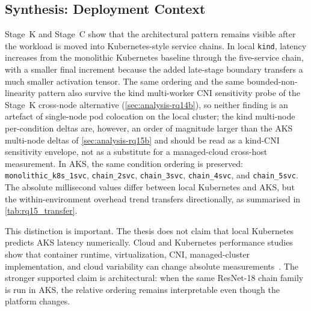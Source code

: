 \subsection{Synthesis: Deployment Context}
\label{sec:analysis-deployment-synthesis}

Stage~K and Stage~C show that the architectural pattern remains visible after the
workload is moved into Kubernetes-style service chains. In local
\texttt{kind}, latency increases from the monolithic Kubernetes baseline
through the five-service chain, with a smaller final increment because
the added late-stage boundary transfers a much smaller
activation tensor. The same ordering and the same bounded-non-linearity
pattern also survive the kind multi-worker CNI sensitivity probe of
the Stage~K cross-node alternative (\cref{sec:analysis-rq14b}), so neither finding is an artefact
of single-node pod colocation on the local cluster; the kind multi-node
per-condition deltas are, however, an order of magnitude larger than the
AKS multi-node deltas of \cref{sec:analysis-rq15b} and should be read as
a kind-CNI sensitivity envelope, not as a substitute for a managed-cloud
cross-host measurement. In AKS, the same condition ordering is preserved:
\texttt{monolithic\_k8s\_1svc}, \texttt{chain\_2svc}, \texttt{chain\_3svc},
\texttt{chain\_4svc}, and \texttt{chain\_5svc}. The absolute millisecond
values differ between local Kubernetes and AKS, but the within-environment
overhead trend transfers directionally, as summarised in
\cref{tab:rq15_transfer}.

This distinction is important. The thesis does not claim that local Kubernetes
predicts AKS latency numerically. Cloud and Kubernetes performance studies
show that container runtime, virtualization, CNI, managed-cluster
implementation, and cloud variability can change absolute
measurements~\cite{managed_k8s_perf,virtualization_costs,cni_k8s_ic2e21,
noise_in_clouds}. The stronger supported claim is architectural: when the
same ResNet-18 chain family is run in AKS, the relative ordering remains
interpretable even though the platform changes.
